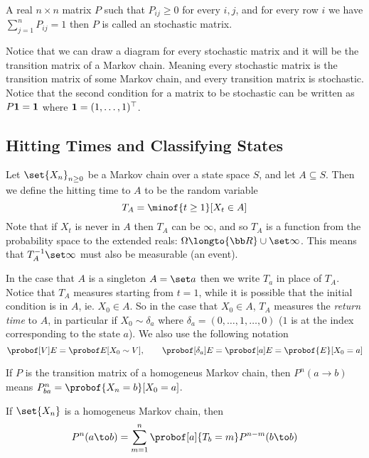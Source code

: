 \eexam

\bdefn

    A real $n\times n$ matrix $P$ such that $P_{ij}\geq0$ for every $i,j$, and for every row $i$ we have $\sum_{j=1}^n P_{ij}=1$ then $P$ is called an {\emphcolor stochastic matrix}.

\edefn

Notice that we can draw a diagram for every stochastic matrix and it will be the transition matrix of a Markov chain.
Meaning every stochastic matrix is the transition matrix of some Markov chain, and every transition matrix is stochastic.
Notice that the second condition for a matrix to be stochastic can be written as $P{\bf1}={\bf1}$ where ${\bf1}=(1,\dots,1)^\top$.

\subsection{Hitting Times and Classifying States}

\bdefn

    Let $\set{X_n}_{n\geq0}$ be a Markov chain over a state space $S$, and let $A\subseteq S$.
    Then we define the {\emphcolor hitting time} to $A$ to be the random variable
    $$ T_A = \minof{t\geq1}[X_t\in A] $$
    Note that if $X_t$ is never in $A$ then $T_A$ can be $\infty$, and so $T_A$ is a function from the probability space to the extended reals: $\Omega\longto{\bb R}\cup\set\infty$.
    This means that $T_A^{-1}\set\infty$ must also be measurable (an event).

\edefn

In the case that $A$ is a singleton $A=\set a$ then we write $T_a$ in place of $T_A$.
Notice that $T_A$ measures starting from $t=1$, while it is possible that the initial condition is in $A$, ie. $X_0\in A$.
So in the case that $X_0\in A$, $T_A$ measures the {\it return time} to $A$, in particular if $X_0\sim\delta_a$ where $\delta_a=(0,\dots,1,\dots,0)$ ($1$ is at the index corresponding to the state $a$).
We also use the following notation
$$ \probof[V]E = \probof E[X_0\sim V],\qquad \probof[\delta_a]E = \probof[a]E = \probof{E}[X_0=a] $$

If $P$ is the transition matrix of a homogeneus Markov chain, then $P^n(a\to b)$ means $P^n_{ba}=\probof{X_n=b}[X_0=a]$.

\blemm

    If $\set{X_n}$ is a homogeneus Markov chain, then
    $$ P^n(a\to b)=\sum_{m=1}^n\probof[a]{T_b=m}P^{n-m}(b\to b) $$

